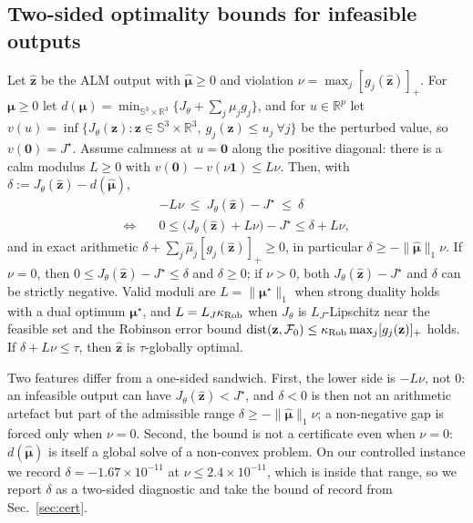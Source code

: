 \subsection{Two-sided optimality bounds for infeasible outputs}\label{sec:conditional}
\begin{theorem}\label{thm:cond}
Let $\hat{\mathbf z}$ be the ALM output with $\hat{\boldsymbol\mu}\ge0$ and violation $\nu=\max_j[g_j(\hat{\mathbf z})]_+$. For $\boldsymbol\mu\ge0$ let $d(\boldsymbol\mu)=\min_{\mathbb{S}^3\times\mathbb{R}^3}\{J_\theta+\sum_j\mu_jg_j\}$, and for $u\in\mathbb{R}^p$ let $v(u)=\inf\{J_\theta(\mathbf z):\mathbf z\in\mathbb{S}^3\times\mathbb{R}^3,\ g_j(\mathbf z)\le u_j\ \forall j\}$ be the perturbed value, so $v(\mathbf 0)=J^\star$. Assume calmness at $u=\mathbf 0$ along the positive diagonal: there is a calm modulus $L\ge0$ with $v(\mathbf 0)-v(\nu\mathbf 1)\le L\nu$. Then, with $\delta:=J_\theta(\hat{\mathbf z})-d(\hat{\boldsymbol\mu})$,
\begin{equation}
\begin{aligned}
&-L\nu\ \le\ J_\theta(\hat{\mathbf z})-J^\star\ \le\ \delta\\
\Longleftrightarrow\quad &0\le\big(J_\theta(\hat{\mathbf z})+L\nu\big)-J^\star\le\delta+L\nu,
\end{aligned}
\label{eq:sandwich}
\end{equation}
and in exact arithmetic $\delta+\sum_j\hat\mu_j[g_j(\hat{\mathbf z})]_+\ge0$, in particular $\delta\ge-\|\hat{\boldsymbol\mu}\|_1\nu$. If $\nu=0$, then $0\le J_\theta(\hat{\mathbf z})-J^\star\le\delta$ and $\delta\ge0$; if $\nu>0$, both $J_\theta(\hat{\mathbf z})-J^\star$ and $\delta$ can be strictly negative. Valid moduli are $L=\|\boldsymbol\mu^\star\|_1$ when strong duality holds with a dual optimum $\boldsymbol\mu^\star$, and $L=L_J\kappa_{\rm Rob}$ when $J_\theta$ is $L_J$-Lipschitz near the feasible set and the Robinson error bound $\operatorname{dist}(\mathbf z,\mathcal F_0)\le\kappa_{\rm Rob}\max_j[g_j(\mathbf z)]_+$ holds. If $\delta+L\nu\le\tau$, then $\hat{\mathbf z}$ is $\tau$-globally optimal.
\end{theorem}
Two features differ from a one-sided sandwich. First, the lower side is $-L\nu$, not $0$: an infeasible output can have $J_\theta(\hat{\mathbf z})<J^\star$, and $\delta<0$ is then not an arithmetic artefact but part of the admissible range $\delta\ge-\|\hat{\boldsymbol\mu}\|_1\nu$; a non-negative gap is forced only when $\nu=0$. Second, the bound is not a certificate even when $\nu=0$: $d(\hat{\boldsymbol\mu})$ is itself a global solve of a non-convex problem. On our controlled instance we record $\delta=-1.67\times10^{-11}$ at $\nu\le2.4\times10^{-11}$, which is inside that range, so we report $\delta$ as a two-sided diagnostic and take the bound of record from Sec.~\ref{sec:cert}.

